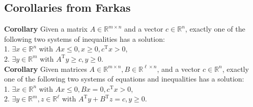 \documentclass[english]{latex4ei_sheet}
\begin{document}
\begin{sectionbox}
\subsection{Corollaries from Farkas}
\textbf{Corollary} Given a matrix $A \in \mathbb{R}^{m \times n}$ and a vector $c \in \mathbb{R}^{n}$, exactly one of the following two systems of inequalities has a solution:\\
1. $\exists x \in \mathbb{R}^{n}$ with $A x \leq 0, x \geq 0, c^{\mathrm{T}} x>0$,\\
2. $\exists y \in \mathbb{R}^{m}$ with $A^{\mathrm{T}} y \geq c, y \geq 0$.\\

\textbf{Corollary} Given matrices $A \in \mathbb{R}^{m \times n}, B \in \mathbb{R}^{\ell \times n}$, and a vector $c \in \mathbb{R}^{n}$, exactly one of the following two systems of equations and inequalities has a solution:\\
1. $\exists x \in \mathbb{R}^{n}$ with $A x \leq 0, B x=0, c^{\mathrm{T}} x>0$,\\
2. $\exists y \in \mathbb{R}^{m}, z \in \mathbb{R}^{\ell}$ with $A^{\mathrm{T}} y+B^{\mathrm{T}} z=c, y \geq 0$.

\end{sectionbox}
\end{document}
